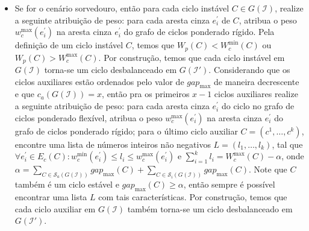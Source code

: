 \begin{itemize}
\begin{itemize}
    \item Se for o cenário sorvedouro, então para cada ciclo instável $C \in G(\mathcal{I})$, realize a seguinte atribuição de peso: para cada aresta cinza $e^{\prime}_i$ de $C$, atribua o peso $w^{\max}_c(e^{\prime}_i)$ na aresta cinza $e^{\prime}_i$ do grafo de ciclos ponderado rígido. Pela definição de um ciclo instável $C$, temos que $W_p(C)  < W^{\min}_c(C)$ ou $W_p(C) > W^{\max}_c(C)$. Por construção, temos que cada ciclo instável em $G(\mathcal{I})$ torna-se um ciclo desbalanceado em $G(\mathcal{I}')$. Considerando que os ciclos auxiliares estão ordenados pelo valor de $gap_{\max}$ de maneira decrescente e que $c_a(G(\mathcal{I})) = x$, então pra os primeiros $x-1$ ciclos auxiliares realize a seguinte atribuição de peso: para cada aresta cinza $e^{\prime}_i$ do ciclo no grafo de ciclos ponderado flexível, atribua o peso $w^{\max}_c(e^{\prime}_i)$ na aresta cinza $e^{\prime}_i$ do grafo de ciclos ponderado rígido; para o último ciclo auxiliar $C=(c^1,\dots,c^k)$, encontre uma lista de números inteiros não negativos $L=(l_1,\dots,l_k)$, tal que $\forall e^{\prime}_i \in E_c(C): w^{\min}_c(e^{\prime}_i) \le l_i \le w^{\max}_c(e^{\prime}_i)$ e $\sum_{i=1}^{k}l_i = W^{\max}_c(C) - \alpha$, onde $\alpha = \sum_{C \in \mathcal{S}_a(G(\mathcal{I}))} gap_{\max}(C) + \sum_{C \in \mathcal{S}_i(G(\mathcal{I}))} gap_{\max}(C)$. Note que $C$ também é um ciclo estável e $gap_{\max}(C) \ge \alpha$, então sempre é possível encontrar uma lista $L$ com tais características. Por construção, temos que cada ciclo auxiliar em $G(\mathcal{I})$ também torna-se um ciclo desbalanceado em $G(\mathcal{I}')$.


\end{itemize}
\end{itemize}

